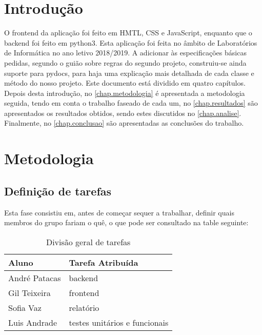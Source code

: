 \documentclass{report}
\begin{document}
\clearpage
{}

\chapter{Introdução}
\label{chap.introducao}

O frontend da aplicação foi feito em HMTL, CSS e JavaScript, enquanto que o backend foi feito em python3. Esta aplicação foi feita no âmbito de Laboratórios de Informática no ano letivo 2018/2019.
A adicionar às especificações básicas pedidas, segundo o guião sobre regras do segundo projeto, construiu-se ainda suporte para pydocs, para haja uma explicação mais detalhada de cada classe e método do nosso projeto.
Este documento está dividido em quatro capítulos.
Depois desta introdução,
no \autoref{chap.metodologia} é apresentada a metodologia seguida, tendo em conta o trabalho faseado de cada um, 
no \autoref{chap.resultados} são apresentados os resultados obtidos,
sendo estes discutidos no \autoref{chap.analise}.
Finalmente, no \autoref{chap.conclusao} são apresentadas
as conclusões do trabalho.

\chapter{Metodologia}
\label{chap.metodologia}
\section{Definição de tarefas}
Esta fase consistiu em, antes de começar sequer a trabalhar, definir quais membros do grupo fariam o quê, o que pode ser consultado na table seguinte: 
\begin{table}[h!]
\begin{center}
\caption{Divisão geral de tarefas}
\label{tab:table1}
\begin{tabular}{l|l}
\hline
\multicolumn{1}{|l|}{Aluno} & \multicolumn{1}{l|}{Tarefa Atribuída} \\ \hline
            André Patacas   & backend                               \\ 
            Gil Teixeira      & frontend                               \\
            Sofia Vaz         & relatório                                \\
            Luis Andrade    & testes unitários e funcionais                     
\end{tabular}
\end{center}
\end{table}
\end{document}
